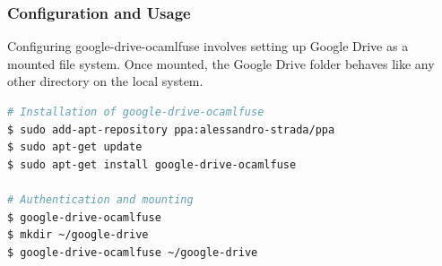 \subsubsection{Configuration and Usage}
Configuring google-drive-ocamlfuse involves setting up Google Drive as a mounted file system. Once mounted, the Google Drive folder behaves like any other directory on the local system.
\begin{lstlisting}[language=bash, caption={google-drive-ocamlfuse Tool installation procedure}, label={lst:ocamlfuse}]
# Installation of google-drive-ocamlfuse
$ sudo add-apt-repository ppa:alessandro-strada/ppa
$ sudo apt-get update
$ sudo apt-get install google-drive-ocamlfuse

# Authentication and mounting
$ google-drive-ocamlfuse
$ mkdir ~/google-drive
$ google-drive-ocamlfuse ~/google-drive
\end{lstlisting}

